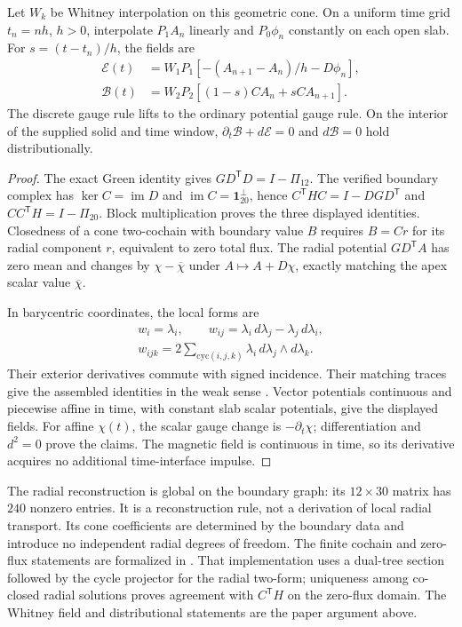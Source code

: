\begin{theorem}
Let \(W_k\) be Whitney interpolation on this geometric cone. On a uniform
time grid \(t_n=nh\), \(h>0\), interpolate \(P_1A_n\) linearly and
\(P_0\phi_n\) constantly on each open slab. For \(s=(t-t_n)/h\), the fields are
\begin{align*}
 \mathcal E(t)&=W_1P_1\left[-(A_{n+1}-A_n)/h-D\phi_n\right],\\
 \mathcal B(t)&=W_2P_2\left[(1-s)CA_n+sCA_{n+1}\right].
\end{align*}
The discrete gauge rule lifts to the ordinary potential gauge rule.
On the interior of the supplied solid and time window,
\(\partial_t\mathcal B+d\mathcal E=0\) and \(d\mathcal B=0\)
hold distributionally.
\end{theorem}

\begin{proof}
The exact Green identity gives
\(GD^{\mathsf T}D=I-\Pi_{12}\). The verified boundary complex has
\(\ker C=\operatorname{im}D\) and
\(\operatorname{im}C=\mathbf1_{20}^{\perp}\), hence
\(C^{\mathsf T}HC=I-DGD^{\mathsf T}\) and \(CC^{\mathsf T}H=I-\Pi_{20}\).
Block multiplication proves the three displayed identities.
Closedness of a cone two-cochain with boundary value \(B\) requires
\(B=Cr\) for its radial component \(r\), equivalent to zero total flux.
The radial potential \(GD^{\mathsf T}A\) has zero mean and changes by
\(\chi-\overline\chi\) under \(A\mapsto A+D\chi\), exactly matching
the apex scalar value \(\overline\chi\).

In barycentric coordinates, the local forms are
\begin{gather*}
 w_i=\lambda_i,\qquad
 w_{ij}=\lambda_i\,d\lambda_j-\lambda_j\,d\lambda_i,\\
 w_{ijk}=2\sum_{\mathrm{cyc}(i,j,k)}
                  \lambda_i\,d\lambda_j\wedge d\lambda_k.
\end{gather*}
Their exterior derivatives commute with signed incidence. Their matching
traces give the assembled identities in the weak sense
\cite{ArnoldFalkWinther2010}. Vector potentials continuous and piecewise
affine in time, with constant slab scalar potentials, give the displayed fields.
For affine \(\chi(t)\), the scalar gauge change is
\(-\partial_t\chi\); differentiation and \(d^2=0\) prove the claims.
The magnetic field is continuous in time, so its derivative acquires no
additional time-interface impulse.
\end{proof}

The radial reconstruction is global on the boundary graph: its
\(12\times30\) matrix has \(240\) nonzero entries. It is a reconstruction
rule, not a derivation of local radial transport. Its cone coefficients are
determined by the boundary data and introduce no independent radial degrees
of freedom. The finite cochain and zero-flux statements are formalized in
. That implementation uses a
dual-tree section followed by the cycle projector for the radial two-form;
uniqueness among co-closed radial solutions proves agreement with
\(C^{\mathsf T}H\) on the zero-flux domain. The Whitney field and
distributional statements are the paper argument above.

